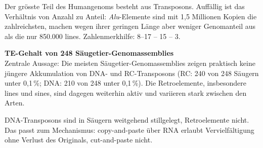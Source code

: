 \begin{bem}
    Der grösste Teil des Humangenoms besteht aus Transposons.
    Auffällig ist das
    Verhältnis von Anzahl zu Anteil: \emph{Alu}-Elemente sind mit 1,5 Millionen
    Kopien die zahlreichsten, machen wegen ihrer geringen Länge aber weniger
    Genomanteil aus als die nur 850.000 \gls{line}s. Zahlenmerkhilfe: 8--17 -- 15 -- 3.
\end{bem}

\begin{bsp}
    \textbf{TE-Gehalt von 248 Säugetier-Genomassemblies} \\
    Zentrale Aussage: Die meisten Säugetier-Genomassemblies zeigen praktisch
    keine jüngere Akkumulation von DNA- und RC-Transposons
    (RC: 240 von 248 Säugern unter 0,1\,\%; DNA: 210 von 248 unter 0,1\,\%). Die
    Retroelemente, insbesondere \gls{line}s und \gls{sine}s, sind dagegen weiterhin aktiv
    und variieren stark zwischen den Arten.
\end{bsp}

\begin{bem}
    DNA-Transposons sind in Säugern weitgehend stillgelegt, Retroelemente
    nicht.
    Das passt zum Mechanismus: copy-and-paste über RNA erlaubt
    Vervielfältigung ohne Verlust des Originals, cut-and-paste nicht.
\end{bem}



